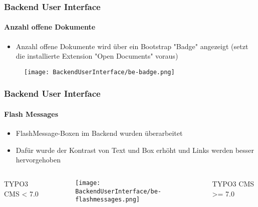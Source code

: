 \begin{frame}[fragile]
	\frametitle{Backend User Interface}
	\framesubtitle{Anzahl offene Dokumente}

	\begin{itemize}
		\item Anzahl offene Dokumente wird über ein Bootstrap "Badge" angezeigt\newline
			(setzt die installierte Extension "Open Documents" voraus)
	\end{itemize}
	\begin{figure}
		\texttt{[image: BackendUserInterface/be-badge.png]}
	\end{figure}

\end{frame}


\begin{frame}[fragile]
	\frametitle{Backend User Interface}
	\framesubtitle{Flash Messages}

	\begin{itemize}
		\item FlashMessage-Boxen im Backend wurden überarbeitet
		\item Dafür wurde der Kontrast von Text und Box erhöht und Links werden besser hervorgehoben
	\end{itemize}

	\begin{columns}[T]
		\begin{column}{.25\textwidth}
			\smaller\hfill 
				\begingroup\color{typo3red}TYPO3 CMS < 7.0\endgroup
			\normalsize
		\end{column}

		\begin{column}{.5\textwidth}
			\begin{figure}\vspace*{-0.6cm}
				\texttt{[image: BackendUserInterface/be-flashmessages.png]}
			\end{figure}
		\end{column}

		\begin{column}{.25\textwidth}
			\smaller
				\begingroup\color{typo3red}TYPO3 CMS >= 7.0\endgroup
			\normalsize
		\end{column}
	\end{columns}

\end{frame}


